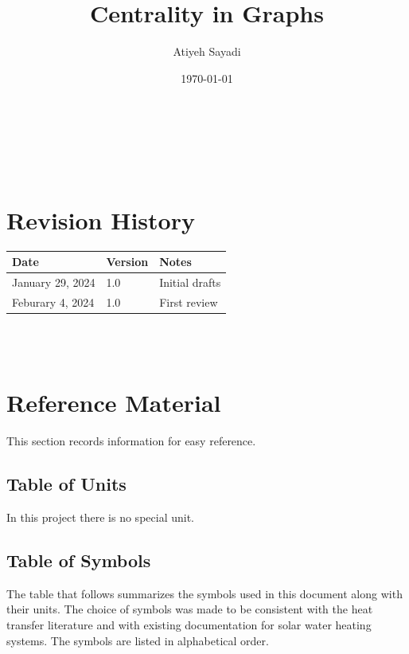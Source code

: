 \documentclass[12pt]{article}
\begin{document}
\title{Centrality in Graphs} 
\author{Atiyeh Sayadi}
\date{\today}
	
\maketitle

~\newpage


\tableofcontents

~\newpage

\section*{Revision History}

\begin{tabularx}{\textwidth}{p{3cm}p{2cm}X}
\toprule {\bf Date} & {\bf Version} & {\bf Notes}\\
\midrule
January 29, 2024  & 1.0 & Initial drafts\\
Feburary 4, 2024  & 1.0 & First review\\

\bottomrule
\end{tabularx}

~\\

~\newpage

\section{Reference Material}

This section records information for easy reference.

\subsection{Table of Units}

In this project there is no special unit. 

\subsection{Table of Symbols}

The table that follows summarizes the symbols used in this document along with
their units.  The choice of symbols was made to be consistent with the heat
transfer literature and with existing documentation for solar water heating
systems.  The symbols are listed in alphabetical order.
\end{document}
